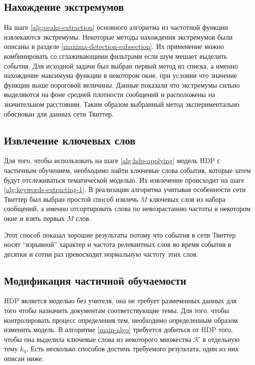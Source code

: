 \documentclass[14pt,a4paper,oneside]{extarticle}
\begin{document}
  \subsection{Нахождение экстремумов}
  На шаге \ref{alg:peaks-extraction} основного алгоритма из частотной функции извлекаются экстремумы. Некоторые методы нахождения экстремумов были описаны в разделе \ref{maxima-detection-subsection}. Их применение можно комбинировать со сглаживающими фильтрами если шум мешает выделить события.
  Для исходной задачи был выбран первый метод из списка, а именно нахождение максимума функции в некотором окне, при условии что значение функции выше пороговой величины. Данные показали что экстремумы сильно выделяются на фоне средней плотности сообщений и расположены на значительном расстоянии. Таким образом выбранный метод экспериментально обоснован для данных сети Твиттер.  
  
  \subsection{Извлечение ключевых слов}
  Для того, чтобы использовать на шаге \ref{alg:hdp-applying} модель HDP с частичным обучением, необходимо найти ключевые слова события, которые затем будут отслеживаться тематической моделью. Их извлечение происходит на шаге \ref{alg:keywords-extracting-1}. В реализации алгоритма учитывая особенности сети Твиттер был выбран простой способ извлечь $M$ ключевых слов из набора сообщений, а именно отсортировать слова по невозрастанию частоты в некотором окне и взять первых $M$ слов.
  
  Этот способ показал хорошие результаты потому что события в сети Твиттер носят ``взрывной'' характер и частота релевантных слов во время события в десятки и сотни раз превосходит нормальную частоту этих слов.
  
  \subsection{Модификация частичной обучаемости}
  HDP является моделью без учителя, она не требует размеченных данных для того чтобы назначить документам соответствующие темы. Для того, чтобы контролировать процесс определения тем, необходимо определенным образом изменить модель. В алгоритме \ref{main-algo} требуется добиться от HDP того, чтобы она выделила ключевые слова из некоторого множества $\mathcal{K}$ в отдельную тему $k_0$. Есть несколько способов достичь требуемого результата, один из них описан ниже.
  
\end{document}
